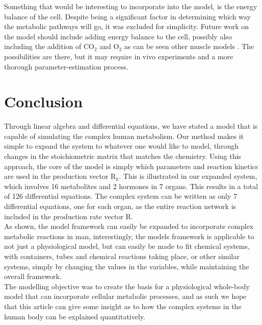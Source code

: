 \documentclass{IEEEtran}
\begin{document}
Something that would be interesting to incorporate into the model, is the energy balance of the cell. Despite being a significant factor in determining which way the metabolic pathways will go, it was excluded for simplicity. Future work on the model should include adding energy balance to the cell, possibly also including the addition of CO$_2$ and O$_2$ as can be seen other muscle models \cite{dash_li_kim_saidel_cabrera_2008}. The possibilities are there, but it may require in vivo experiments and a more thorough parameter-estimation process.

\section{Conclusion}
\label{sec:conclusion}


Through linear algebra and differential equations, we have stated a model that is capable of simulating the complex human metabolism. Our method makes it simple to expand the system to whatever one would like to model, through changes in the stoichiometric matrix that matches the chemistry. Using this approach, the core of the model is simply which parameters and reaction kinetics are used in the production vector R$_k$. This is illustrated in our expanded system, which involves 16 metabolites and 2 hormones in 7 organs. This results in a total of 126 differential equations. The complex system can be written as only 7 differential equations, one for each organ, as the entire reaction network is included in the production rate vector R. \\

As shown, the model framework can easily be expanded to incorporate complex metabolic reactions in man, interestingly, the models framework is applicable to not just a physiological model, but can easily be made to fit chemical systems, with containers, tubes and chemical reactions taking place, or other similar systems, simply by changing the values in the variables, while maintaining the overall framework. \\

The modelling objective was to create the basis for a physiological whole-body model that can incorporate cellular metabolic processes, and as such we hope that this article can give some insight as to how the complex systems in the human body can be explained quantitatively.
\end{document}
